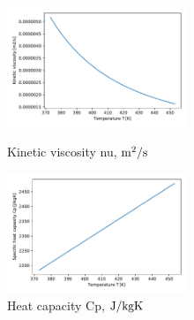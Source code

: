 \documentclass[conference]{IEEEtran}
\begin{document}
\begin{figure}[h]
\begin{minipage}{0.48\linewidth}
 \includegraphics[width=0.48\textwidth,natwidth=190,natheight=210]{fig/kinetic_viscosity.pdf}
 \vspace{-1zh}
 \caption{Kinetic viscosity nu, $\rm m^{2}/s$}\label{kinetic_viscosity}
\end{minipage}
\hfill
\begin{minipage}{0.48\linewidth}
 \includegraphics[width=0.48\textwidth,natwidth=190,natheight=210]{fig/heat_capacity.pdf}
 \vspace{-1zh}
 \caption{Heat capacity Cp, $\rm J/kgK$}\label{heat_capacity}
\end{minipage}
\vspace{2zh}
\end{figure}
\end{document}
